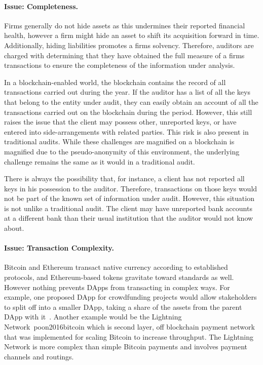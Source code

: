 \paragraph{Issue: Completeness.} Firms generally do not hide assets as this undermines their reported financial health, however a firm might hide an asset to shift its acquisition forward in time. Additionally, hiding liabilities promotes a firm\textquotesingle s solvency. Therefore, auditors are charged with determining that they have obtained the full measure of a firm\textquotesingle s transactions to ensure the completeness of the information under analysis.

In a blockchain-enabled world, the blockchain contains the record of all transactions carried out during the year. If the auditor has a list of all the keys that belong to the entity under audit, they can easily obtain an account of all the transactions carried out on the blockchain during the period. However, this still raises the issue that the client may possess other, unreported keys, or have entered into side-arrangements with related parties. This risk is also present in traditional audits. While these challenges are magnified on a blockchain is magnified due to the pseudo-anonymity of this environment, the underlying challenge remains the same as it would in a traditional audit.

There is always the possibility that, for instance, a client has not reported all keys in his possession to the auditor. Therefore, transactions on those keys would not be part of the known set of information under audit. However, this situation is not unlike a traditional audit. The client may have unreported bank accounts at a different bank than their usual institution that the auditor would not know about. 

\paragraph{Issue: Transaction Complexity.} Bitcoin and Ethereum transact native currency according to established protocols, and Ethereum-based tokens gravitate toward standards as well. However nothing prevents DApps from transacting in complex ways. For example, one proposed DApp for crowdfunding projects would allow stakeholders to split off into a smaller DApp, taking a share of the assets from the parent DApp with it~\cite{dupont2017experiments}. Another example would be the Lightning Network~{poon2016bitcoin} which is second layer, off blockchain payment network that was implemented for scaling Bitcoin to increase throughput. The Lightning Network is more complex than simple Bitcoin payments and involves payment channels and routings.
 
